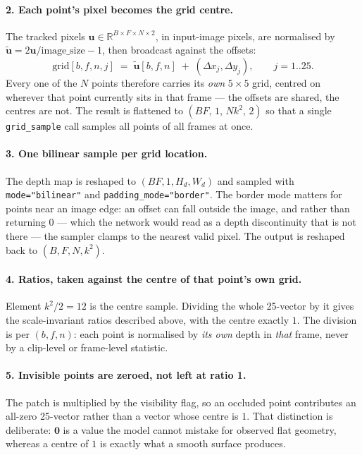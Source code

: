 \documentclass[11pt,a4paper]{article}
\begin{document}
\paragraph{2. Each point's pixel becomes the grid centre.} The tracked pixels
$\mathbf{u}\in\mathbb{R}^{B\times F\times N\times 2}$, in input-image pixels, are normalised by
$\tilde{\mathbf{u}} = 2\mathbf{u}/\text{image\_size}-1$, then broadcast against the offsets:
%
\[
  \text{grid}[b,f,n,j] \;=\; \tilde{\mathbf{u}}[b,f,n] \;+\; (\Delta x_j,\Delta y_j),
  \qquad j = 1..25 .
\]
%
Every one of the $N$ points therefore carries its \emph{own} $5{\times}5$ grid, centred on wherever
that point currently sits in that frame --- the offsets are shared, the centres are not. The result
is flattened to $(BF,\,1,\,N k^2,\,2)$ so that a single \texttt{grid\_sample} call samples all
points of all frames at once.

\paragraph{3. One bilinear sample per grid location.} The depth map is reshaped to $(BF,1,H_d,W_d)$
and sampled with \texttt{mode="bilinear"} and \texttt{padding\_mode="border"}. The border mode
matters for points near an image edge: an offset can fall outside the image, and rather than
returning $0$ --- which the network would read as a depth discontinuity that is not there --- the
sampler clamps to the nearest valid pixel. The output is reshaped back to $(B,F,N,k^2)$.

\paragraph{4. Ratios, taken against the centre of that point's own grid.} Element $k^2/2=12$ is the
centre sample. Dividing the whole 25-vector by it gives the scale-invariant ratios described above,
with the centre exactly $1$. The division is per $(b,f,n)$: each point is normalised by \emph{its
own} depth in \emph{that} frame, never by a clip-level or frame-level statistic.

\paragraph{5. Invisible points are zeroed, not left at ratio 1.} The patch is multiplied by the
visibility flag, so an occluded point contributes an all-zero 25-vector rather than a vector whose
centre is $1$. That distinction is deliberate: $\mathbf{0}$ is a value the model cannot mistake for
observed flat geometry, whereas a centre of $1$ is exactly what a smooth surface produces.
\end{document}
